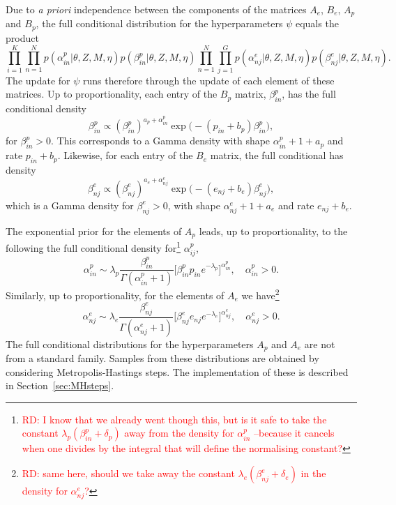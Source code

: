 \documentclass[11pt]{amsart}
\theoremstyle{definition}
\theoremstyle{remark}
\begin{document}
Due to \emph{a priori} independence between the
components of the matrices $A_e$, $B_e$, $A_p$ and $B_p$, the full
conditional distribution for the hyperparameters $\psi$ equals the
product
\[
   \prod_{i=1}^K\prod_{n=1}^N
     p(\alpha_{in}^p| \theta, Z, M, \eta)
     p(\beta_{in}^p|\theta, Z, M, \eta)
   \prod_{n=1}^N\prod_{j=1}^G
     p(\alpha_{nj}^e|\theta, Z, M, \eta)
     p(\beta_{nj}^e|\theta, Z, M, \eta).
\]
The update for $\psi$ runs therefore through the update of each
element of these matrices. Up to proportionality, each entry of the
$B_p$ matrix, $\beta_{in}^p$,  has the full conditional density
\begin{equation}
 \label{eqn:Full_for_Bp}
 \beta_{in}^p
   \propto
   (\beta_{in}^p)^{a_p + \alpha_{in}^p} 
   \exp\Big(-(p_{in}+b_p)\beta_{in}^p\Big),\tag{$s_4$}
\end{equation}
for $\beta_{in}^p > 0$. This corresponds to a Gamma density with shape
$\alpha_{in}^p + 1 + a_p$ and rate $p_{in} + b_p$.  Likewise, for each
entry of the $B_e$ matrix, the full conditional has density 
\begin{equation}
 \label{eqn:Full_for_Be}
 \beta_{nj}^e
   \propto
  (\beta_{nj}^e)^{a_e + \alpha_{nj}^e} 
  \exp\Big(-(e_{nj}+b_e)\beta_{nj}^e\Big),\tag{$s_5$}
\end{equation}
which is a  Gamma density for $\beta_{nj}^e > 0$, with shape
$\alpha_{nj}^e + 1+ a_e$ and rate $e_{nj}+b_e$. 


The exponential prior for the elements of $A_p$ leads, up to
proportionality, to the following the full conditional density
for\footnote{\textcolor{red}{RD: I know that we already went though
    this, but  is it safe to take the constant $\lambda_p(\beta_{in}^p
    + \delta_p)$ away from the density for $\alpha_{in}^p$ --because
    it  cancels when one divides by the integral that will define the
    normalising constant?}}
$\alpha_{ij}^p$,
\begin{equation}
 \label{eqn:Full_for_Ap}
  \alpha_{in}^p 
  \sim 
  \lambda_p\frac{\beta_{in}^p}{\Gamma(\alpha_{in}^p + 1)} 
   \Big[\beta_{in}^pp_{in}
   e^{-\lambda_p}\Big]^{\alpha_{in}^p}, \tag{$s_6$}
   \quad  \alpha_{in}^p > 0.
\end{equation}
Similarly, up to proportionality, for the elements of $A_e$ we
have\footnote{\textcolor{red}{RD: same here, should we take away the
    constant 
  $\lambda_e(\beta_{nj}^e + \delta_e)$ in the density for
  $\alpha_{nj}^e$?}}
\begin{equation}
 \label{eqn:Full_for_Ae}
  \alpha_{nj}^e 
  \sim
  \lambda_e\frac{\beta_{nj}^e}{\Gamma(\alpha_{nj}^e + 1)} 
   \Big[\beta_{nj}^e e_{nj}
   e^{-\lambda_e}\Big]^{\alpha_{nj}^e}, 
   \quad  \alpha_{nj}^e > 0. \tag{$s_7$}
\end{equation}
The full conditional distributions for the hyperparameters $A_p$ and
$A_e$ are not from a standard family. Samples from these distributions
are obtained by considering Metropolis-Hastings steps. The
implementation of these is described in Section~\ref{sec:MHsteps}.
\end{document}
